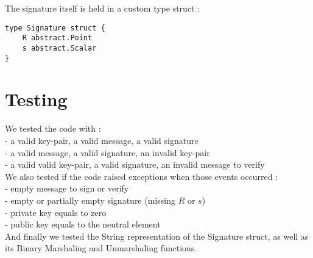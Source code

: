 \documentclass{article}
\begin{document}
\noindent
The signature itself is held in a custom type struct :
\begin{verbatim}
type Signature struct {
    R abstract.Point
    s abstract.Scalar
}    
\end{verbatim}





\section{Testing}

We tested the code with : \\
- a valid key-pair, a valid message, a valid signature \\
- a valid message, a valid signature, an invalid key-pair \\
- a valid valid key-pair, a valid signature, an invalid message to verify \\

\noindent
We also tested if the code raised exceptions when those events occurred : \\
- empty message to sign or verify \\
- empty or partially empty signature (missing $R$ or $s$) \\
- private key equals to zero \\
- public key equals to the neutral element \\

\noindent
And finally we tested the String representation of the Signature struct, as well as its Binary Marshaling and Unmarshaling functions.
\end{document}
